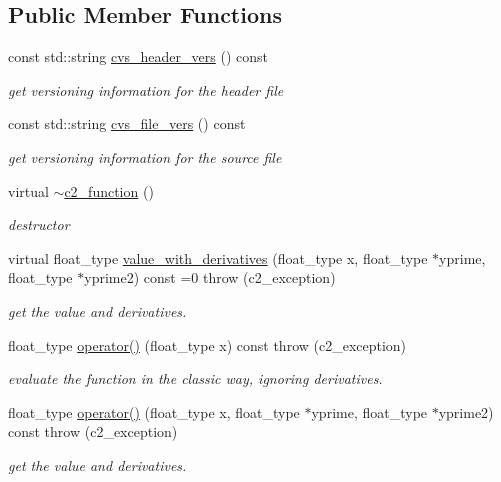 \subsection*{Public Member Functions}
\begin{DoxyCompactItemize}
\item 
const std\+::string \hyperlink{classc2__function_a851a9e8dca6e8fa9c2da12c8705566b2}{cvs\+\_\+header\+\_\+vers} () const 
\begin{DoxyCompactList}\small\item\em get versioning information for the header file \end{DoxyCompactList}\item 
const std\+::string \hyperlink{classc2__function_a2304b7543724be829571336da02b0f91}{cvs\+\_\+file\+\_\+vers} () const 
\begin{DoxyCompactList}\small\item\em get versioning information for the source file \end{DoxyCompactList}\item 
virtual \hyperlink{classc2__function_ab17870e5af508c66ec154195b837466e}{$\sim$c2\+\_\+function} ()
\begin{DoxyCompactList}\small\item\em destructor \end{DoxyCompactList}\item 
virtual float\+\_\+type \hyperlink{classc2__function_a44e0201159111350be7f746fc9026f67}{value\+\_\+with\+\_\+derivatives} (float\+\_\+type x, float\+\_\+type $\ast$yprime, float\+\_\+type $\ast$yprime2) const =0  throw (c2\+\_\+exception)
\begin{DoxyCompactList}\small\item\em get the value and derivatives. \end{DoxyCompactList}\item 
float\+\_\+type \hyperlink{classc2__function_a0658cb22966f0ff9072d4d0e04b54c61}{operator()} (float\+\_\+type x) const   throw (c2\+\_\+exception)
\begin{DoxyCompactList}\small\item\em evaluate the function in the classic way, ignoring derivatives. \end{DoxyCompactList}\item 
float\+\_\+type \hyperlink{classc2__function_a25c89b64e6cbd749314d0a61063240cc}{operator()} (float\+\_\+type x, float\+\_\+type $\ast$yprime, float\+\_\+type $\ast$yprime2) const   throw (c2\+\_\+exception)
\begin{DoxyCompactList}\small\item\em get the value and derivatives. \end{DoxyCompactList}\item 

\end{DoxyCompactItemize}
